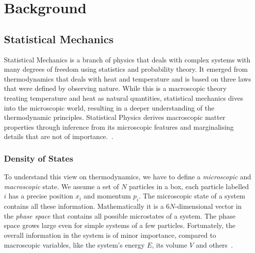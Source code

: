 % 
% 
% 
% 
% 
% 


\chapter{Background}

\section{Statistical Mechanics}
\label{sec:StatMech}
Statistical Mechanics is a branch of physics that deals with complex systems with many degrees of freedom using statistics and probability theory. It emerged from thermodynamics that deals with heat and temperature and is based on three laws that were defined by observing nature.  While this is a macroscopic theory treating temperature and heat as natural quantities, statistical mechanics dives into the microscopic world, resulting in a deeper understanding of the thermodynamic principles. Statistical Physics derives macroscopic matter properties through inference from its microscopic features and marginalising details that are not of importance.~\cite{StatMech}.  

\subsection{Density of States}
\label{sec:DoS}
To understand this view on thermodynamics, we have to define a \textit{microscopic} and \textit{macroscopic} state. We assume a set of $N$  particles in a box, each particle labelled $i$ has a precise position $x_i$ and momentum $p_i$. The microscopic state of a system contains all these information. Mathematically it is a $6N$-dimensional vector in the \textit{phase space} that contains all possible microstates of a system. The phase space grows large even for simple systems of a few particles. Fortunately, the overall information in the system is of minor importance, compared to macroscopic variables, like the system's energy $E$, its volume $V$ and others~\cite{StatMech}. 

